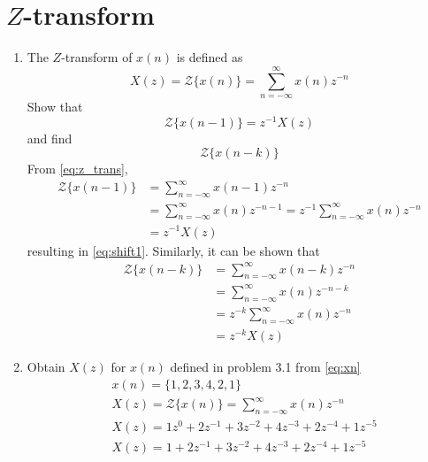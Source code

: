 \documentclass[journal,12pt,twocolumn]{IEEEtran}
\renewcommand\thesection{\arabic{section}}
\begin{document}
\section{$Z$-transform}
\begin{enumerate}[label=\thesection.\arabic*]
\item The $Z$-transform of $x(n)$ is defined as
%
\begin{equation}
\label{eq:z_trans}
X(z)={\mathcal {Z}}\{x(n)\}=\sum _{n=-\infty }^{\infty }x(n)z^{-n}
\end{equation}
%
Show that
\begin{equation}
\label{eq:shift1}
{\mathcal {Z}}\{x(n-1)\} = z^{-1}X(z)
\end{equation}
and find
\begin{equation}
	{\mathcal {Z}}\{x(n-k)\} 
\end{equation}
\solution From \eqref{eq:z_trans},
\begin{align}
{\mathcal {Z}}\{x(n-1)\} &=\sum _{n=-\infty }^{\infty }x(n-1)z^{-n}
\\
&=\sum _{n=-\infty }^{\infty }x(n)z^{-n-1} = z^{-1}\sum _{n=-\infty }^{\infty }x(n)z^{-n} \\
&= z^{-1}X(z)
\end{align}
resulting in \eqref{eq:shift1}. Similarly, it can be shown that
%
\begin{align}
\label{eq:z_trans_shift}
     {\mathcal {Z}}\{x(n-k)\} &= \sum _{n=-\infty }^{\infty }x(n-k)z^{-n} \\
     &= \sum _{n=-\infty }^{\infty }x(n)z^{-n-k} \\
     &= z^{-k} \sum _{n=-\infty }^{\infty }x(n)z^{-n} \\         
	&=z^{-k}X(z)
\end{align}

\item  Obtain $X(z)$ for $x(n)$ defined in problem 3.1
\solution 
from \ref{eq:xn} 
\begin{align}
     &x(n) = \{1,2,3,4,2,1\} \\
     &X(z) = {\mathcal {Z}}\{x(n)\} = \sum _{n=-\infty }^{\infty }x(n)z^{-n} \\
     &X(z) = 1z^{0}+2z^{-1}+3z^{-2}+4z^{-3}+2z^{-4}+1z^{-5} \\
     &X(z) = 1+2z^{-1}+3z^{-2}+4z^{-3}+2z^{-4}+1z^{-5} 
\end{align}


\end{enumerate}
\end{document}
